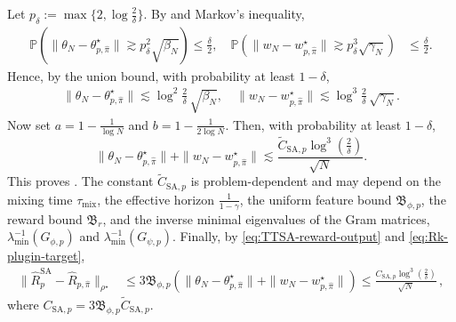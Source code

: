 \documentclass{article}
\theoremstyle{definition}
\theoremstyle{remark}
\theoremstyle{plain}
\newcommand{\tmix}{\tau_{\mathrm{mix}}}
\def\eqsp{\,}
\newcommand{\dsieve}{p}
\numberwithin{equation}{section}
\begin{document}
Let
\(
    p_\delta
    :=
    \max\{
        2,
        \log\frac{2}{\delta}
    \}.
\)
By  and Markov's inequality,
\begin{align}
    \mathbb P\left(
        \|\theta_{N}-\theta^\star_{\dsieve,\widehat\pi}\|
        \gtrsim
        p_\delta^2\sqrt{\beta_N}
    \right)
    \leq
    \frac{\delta}{2},
    \quad
    \mathbb P\left(
        \|w_{N}-w^\star_{\dsieve,\widehat\pi}\|
        \gtrsim
        p_\delta^3\sqrt{\gamma_N}
    \right)
    &\leq
    \frac{\delta}{2}.
\end{align}
Hence, by the union bound, with probability at least \(1-\delta\),
\begin{align}
    \|\theta_{N}-\theta^\star_{\dsieve,\widehat\pi}\|
    \lesssim
    \log^2\frac{2}{\delta}\,
    \sqrt{\beta_N},
    \quad
    \|w_{N}-w^\star_{\dsieve,\widehat\pi}\|
    \lesssim
    \log^3\frac{2}{\delta}\,
    \sqrt{\gamma_N}.
\end{align}
Now set
\(
    a
    =
    1-\frac{1}{\log N}
\) and 
\(
    b
    =
    1-\frac{1}{2\log N}.
\) 
Then, with probability at least \(1-\delta\),
\begin{equation}
\label{eq:ttsa-high-probability-bound}
    \|\theta_{N}-\theta^\star_{\dsieve,\widehat\pi}\|
    +
    \|w_{N}-w^\star_{\dsieve,\widehat\pi}\|
    \lesssim
    \frac{\widetilde C_{\mathrm{SA},\dsieve}\log^3(\frac2\delta)}{\sqrt N}.
\end{equation}
This proves . The constant
\(\widetilde C_{\mathrm{SA},\dsieve}\) is problem-dependent and may depend on the mixing time
\(\tmix\), the effective horizon \(\frac{1}{1-\gamma}\), the uniform feature bound
\(\mathfrak B_{\phi,\dsieve}\), the reward bound \(\mathfrak B_r\), and the inverse
 minimal eigenvalues of the Gram matrices,
\(\lambda_{\min}^{-1}(G_{\phi,\dsieve})\) and
\(\lambda_{\min}^{-1}(G_{\psi,\dsieve})\). Finally, by \eqref{eq:TTSA-reward-output} and
\eqref{eq:Rk-plugin-target},
\[
\begin{aligned}
    \|
        \widehat R_{\dsieve}^{\mathrm{SA}}
        -
        \widehat R_{\dsieve,\widehat\pi}
    \|_{\rho^\star}
    &\leq
  3\mathfrak B_{\phi, \dsieve}
    \left(
        \|\theta_N-\theta_{\dsieve,\widehat\pi}^\star\|
        +
        \|w_N-w_{\dsieve,\widehat\pi}^\star\|
    \right)\le \frac{C_{\mathrm{SA},\dsieve}\log^3(\frac2\delta)}{\sqrt N}\eqsp,
\end{aligned}
\]
where \(C_{\mathrm{SA},\dsieve} = 3\mathfrak B_{\phi, \dsieve}\widetilde C_{\mathrm{SA},\dsieve}\).
\end{document}
